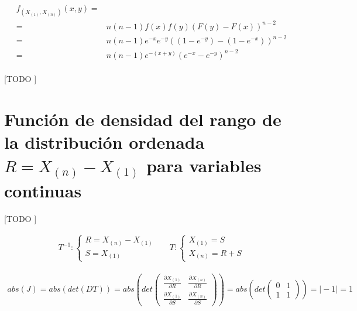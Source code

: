 \documentclass{article}
\begin{document}
      \begin{align}
        f_{(X_{(1)}, X_{(n)})} (x,y) =& \\
        =& n(n-1)f(x)f(y)(F(y) - F(x))^{n-2} \\
        =& n  (n-1) e^{-x} e^{-y} ( (1 - e^{-y}) - (1 - e^{-x}) )^{n-2} \\
        =& n  (n-1) e^{-(x+y)} ( e^{-x} - e^{-y} )^{n-2}
      \end{align}

      \paragraph{}
      [TODO ]

  \section{Función de densidad del rango de la distribución ordenada $R = X_{(n)} - X_{(1)}$ para variables continuas}
  \label{sec:e2}

    \paragraph{}
    [TODO ]

    \begin{align}
      T^{-1}:
      \begin{cases}
        R = X_{(n)} - X_{(1)} \\
        S = X_{(1)}
      \end{cases} &&
      T:
      \begin{cases}
        X_{(1)} = S \\
        X_{(n)} = R + S
      \end{cases}
    \end{align}

    \begin{align}
      abs(J) =  abs(det(DT)) = abs\left(det\left( \begin{array}{cc}
\frac{\partial X_{(1)}}{ \partial R} & \frac{\partial X_{(n)}}{ \partial R}  \\
\frac{\partial X_{(1)}}{ \partial S} & \frac{\partial X_{(n)}}{ \partial S} \end{array} \right) \right) = abs\left(det\left( \begin{array}{cc}
0 & 1  \\
1 & 1 \end{array} \right) \right)  = \mid -1\mid = 1
    \end{align}
\end{document}
